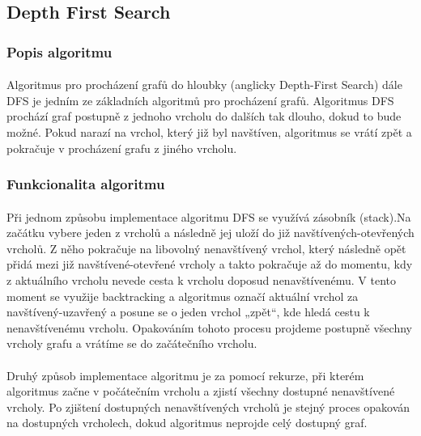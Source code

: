 \documentclass[12pt, titlepage, a4paper]{article}
\begin{document}
\subsection{Depth First Search}
\subsubsection{Popis algoritmu}
\paragraph{}
Algoritmus pro procházení grafů do hloubky (anglicky Depth-First Search) dále DFS
je jedním ze základních algoritmů pro procházení grafů. Algoritmus DFS prochází
graf postupně z jednoho vrcholu do dalších tak dlouho, dokud to bude možné.
Pokud narazí na vrchol, který již byl navštíven, algoritmus se vrátí zpět a pokračuje
v procházení grafu z jiného vrcholu.
~\cite{GeeksforGeeks: DFS,Khan Academy: DFS}

\subsubsection{Funkcionalita algoritmu}
\paragraph{}
Při jednom způsobu implementace algoritmu DFS se využívá zásobník (stack).Na začátku vybere jeden z vrcholů a
následně jej uloží do již navštívených-otevřených vrcholů. Z něho pokračuje na libovolný nenavštívený vrchol,
který následně opět přidá mezi již navštívené-otevřené vrcholy a takto pokračuje až do momentu, kdy
z aktuálního vrcholu nevede cesta k vrcholu doposud nenavštívenému. V tento moment se využije
backtracking a algoritmus označí aktuální vrchol za navštívený-uzavřený a posune se o jeden vrchol
„zpět“, kde hledá cestu k nenavštívenému vrcholu. Opakováním tohoto procesu projdeme postupně
všechny vrcholy grafu a vrátíme se do začátečního vrcholu.

\paragraph{}
Druhý způsob implementace algoritmu je za pomocí rekurze, při kterém algoritmus začne v
počátečním vrcholu a zjistí všechny dostupné nenavštívené vrcholy. Po zjištení dostupných
nenavštívených vrcholů je stejný proces opakován na dostupných vrcholech, dokud algoritmus
neprojde celý dostupný graf.
~\cite{GeeksforGeeks: DFS,Khan Academy: DFS}
\end{document}
